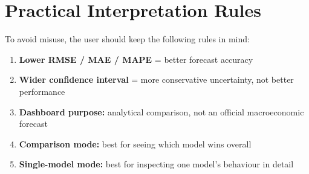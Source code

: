 \section{Practical Interpretation Rules}

To avoid misuse, the user should keep the following rules in mind:

\begin{tcolorbox}[colback=orange!5!white, colframe=orange!75!black, title=Interpretation Cheat Sheet]
\begin{enumerate}
    \item \textbf{Lower RMSE / MAE / MAPE} = better forecast accuracy
    \item \textbf{Wider confidence interval} = more conservative uncertainty, not better performance
    \item \textbf{Dashboard purpose:} analytical comparison, not an official macroeconomic forecast
    \item \textbf{Comparison mode:} best for seeing which model wins overall
    \item \textbf{Single-model mode:} best for inspecting one model's behaviour in detail
\end{enumerate}
\end{tcolorbox}
